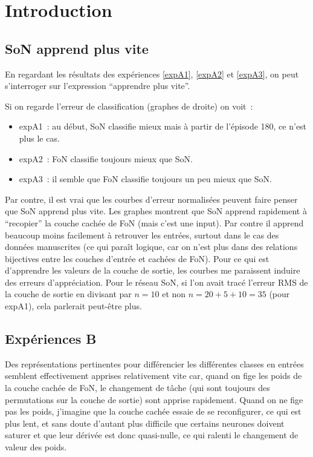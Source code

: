 \section{Introduction
\label{sec:intro}}
\subsection{SoN apprend plus vite
\label{sec:app_vite}}
En regardant les résultats des expériences \ref{expA1}, \ref{expA2} et \ref{expA3}, on peut s'interroger sur l'expression ``apprendre plus vite''.

Si on regarde l'erreur de classification (graphes de droite) on voit~:
\begin{itemize}
\item expA1~: au début, SoN classifie mieux mais à partir de l'épisode 180, ce n'est plus le cas.
\item expA2~: FoN classifie toujours mieux que SoN.
\item expA3~: il semble que FoN classifie toujours un peu mieux que SoN.
\end{itemize}

Par contre, il est vrai que les courbes d'erreur normalisées peuvent faire penser que SoN apprend plus vite. Les graphes montrent que SoN apprend rapidement à ``recopier'' la couche cachée de FoN (mais c'est une input). Par contre il apprend beaucoup moins facilement à retrouver les entrées, surtout dans le cas des données manuscrites (ce qui paraît logique, car on n'est plus dans des relations bijectives entre les couches d'entrée et cachées de FoN). Pour ce qui est d'apprendre les valeurs de la couche de sortie, les courbes me paraissent induire des erreurs d'appréciation. Pour le réseau SoN, si l'on avait tracé l'erreur RMS de la couche de sortie en divisant par $n=10$ et non $n=20+5+10=35$ (pour expA1), cela parlerait peut-être plus.

\subsection{Expériences B
\label{sec:expB}}

Des représentations pertinentes pour différencier les différentes classes en entrées semblent effectivement apprises relativement vite car, quand on fige les poids de la couche cachée de FoN, le changement de tâche (qui sont toujours des permutations sur la couche de sortie) sont apprise rapidement. Quand on ne fige pas les poids, j'imagine que la couche cachée essaie de se reconfigurer, ce qui est plus lent, et sans doute d'autant plus difficile que certains neurones doivent saturer et que leur dérivée est donc quasi-nulle, ce qui ralenti le changement de valeur des poids.

